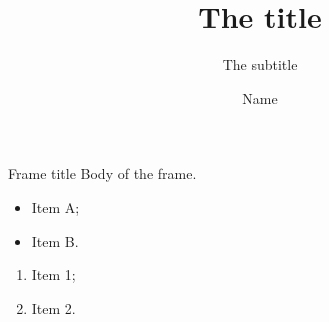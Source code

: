 \documentclass{beamer}
\title{The title}
\subtitle{The subtitle}
\author{Name}
\begin{document}
\begin{frame}
	\titlepage
\end{frame}

\begin{frame}{Frame title}
	Body of the frame.

	\begin{itemize}
		\item Item A;
		\item Item B.
	\end{itemize}

	\begin{enumerate}
		\item Item 1;
		\item Item 2.
	\end{enumerate}

\end{frame}
\end{document}
